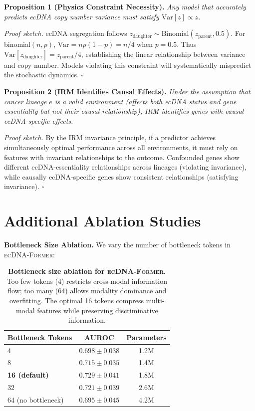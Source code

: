 \documentclass{article}
\newcommand{\former}{\textsc{ecDNA-Former}}
\begin{document}
\textbf{Proposition 1 (Physics Constraint Necessity).} \textit{Any model that accurately predicts ecDNA copy number variance must satisfy $\text{Var}[z] \propto z$.}

\textit{Proof sketch.} ecDNA segregation follows $z_{\text{daughter}} \sim \text{Binomial}(z_{\text{parent}}, 0.5)$. For binomial$(n, p)$, $\text{Var} = np(1-p) = n/4$ when $p=0.5$. Thus $\text{Var}[z_{\text{daughter}}] = z_{\text{parent}}/4$, establishing the linear relationship between variance and copy number. Models violating this constraint will systematically mispredict the stochastic dynamics. $\square$

\textbf{Proposition 2 (IRM Identifies Causal Effects).} \textit{Under the assumption that cancer lineage $e$ is a valid environment (affects both ecDNA status and gene essentiality but not their causal relationship), IRM identifies genes with causal ecDNA-specific effects.}

\textit{Proof sketch.} By the IRM invariance principle, if a predictor achieves simultaneously optimal performance across all environments, it must rely on features with invariant relationships to the outcome. Confounded genes show different ecDNA-essentiality relationships across lineages (violating invariance), while causally ecDNA-specific genes show consistent relationships (satisfying invariance). $\square$


\section{Additional Ablation Studies}
\label{app:ablations}

\textbf{Bottleneck Size Ablation.} We vary the number of bottleneck tokens in \former{}:

\begin{table}[h]
\caption{\textbf{Bottleneck size ablation for \former{}.} Too few tokens (4) restricts cross-modal information flow; too many (64) allows modality dominance and overfitting. The optimal 16 tokens compress multi-modal features while preserving discriminative information.}
\centering
\small
\begin{tabular}{@{}lcc@{}}
\toprule
Bottleneck Tokens & AUROC & Parameters \\
\midrule
4 & $0.698 \pm 0.038$ & 1.2M \\
8 & $0.715 \pm 0.035$ & 1.4M \\
\textbf{16 (default)} & $\mathbf{0.729 \pm 0.041}$ & 1.8M \\
32 & $0.721 \pm 0.039$ & 2.6M \\
64 (no bottleneck) & $0.695 \pm 0.045$ & 4.2M \\
\bottomrule
\end{tabular}
\end{table}
\end{document}
